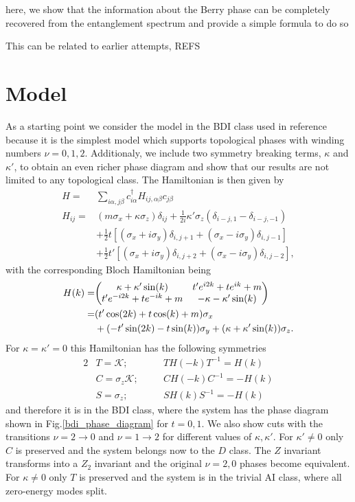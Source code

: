 \documentclass[twocolumn,amsmath,longbibliography,amssymb,superscriptaddress]{revtex4-1}
\begin{document}
here, we show that the information about the Berry phase can be completely recovered from the entanglement spectrum and provide a simple formula to do so

This can be related to earlier attempts, REFS

\section{Model}

As a starting point we consider the model in the BDI class used in reference \cite{Song2014} because it is the simplest model which supports topological phases with winding numbers $\nu = 0,1,2$. Additionaly, we include two symmetry breaking terms, $\kappa$ and $\kappa'$, to obtain an even richer phase diagram and show that our results are not limited to any topological class. The Hamiltonian is then given by
\begin{align}
H =& \sum_{i\alpha,j\beta} c_{i\alpha}^\dagger H_{ij,\alpha \beta} c_{j\beta} \\
H_{ij} =& (m \sigma_x + \kappa \sigma_z)\delta_{ij}  + \frac{1}{2i}\kappa'\sigma_z (\delta_{i-j,1}-\delta_{i-j,-1})\\
&+ \frac{1}{2} t \left[(\sigma_x + i \sigma_y)\delta_{i,j+1} + (\sigma_x - i \sigma_y) \delta_{i,j-1} \right] \\
&+  \frac{1}{2} t' \left[(\sigma_x + i \sigma_y)\delta_{i,j+2} + (\sigma_x - i \sigma_y) \delta_{i,j-2} \right],
\label{bdi_model}
\end{align}
with the corresponding Bloch Hamiltonian being
\begin{align*}
H(k)=&\mqty( \kappa + \kappa' \sin(k) & t' e^{i2k} + t e^{ik}+m \\t' e^{-i2k} + t e^{-ik}+m & -\kappa-\kappa' \sin(k)  ) \\
=& (t' \cos(2k)+t\cos(k)+m)\sigma_x \\
&+ (-t' \sin(2k)-t\sin(k))\sigma_y + (\kappa+\kappa'\sin(k)) \sigma_z.
\end{align*}
For $\kappa = \kappa' = 0$ this Hamiltonian has the following symmetries
\begin{alignat*}{2}
&T = \mathcal{K} ; \quad &&T H(-k) T^{-1} = H(k) \\
&C = \sigma_z\mathcal{K} ; \quad &&C H(-k) C^{-1} = -H(k) \\
&S = \sigma_z ; \quad &&S H(k)S^{-1} = -H(k) 
\end{alignat*}
and therefore it is in the BDI class, where the system has the phase diagram shown in Fig.\ref{bdi_phase_diagram} for $t=0,1$. We also show cuts with the transitions $\nu = 2 \rightarrow 0$ and $\nu = 1 \rightarrow 2$ for different values of $\kappa,\kappa'$.  For $\kappa' \neq 0$ only $C$ is preserved and the system belongs now to the $D$ class. The $Z$ invariant transforms into a $Z_2$ invariant and the original $\nu = 2,0$ phases become equivalent. For $\kappa \neq 0$ only $T$ is preserved and the system is in the trivial AI class, where all zero-energy modes split.
\end{document}
